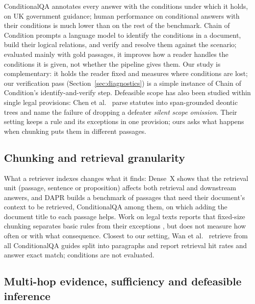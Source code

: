 ConditionalQA \cite{sun2022conditionalqa} annotates every answer with the conditions under which it holds, on UK government guidance; human performance on conditional answers with their conditions is much lower than on the rest of the benchmark. Chain of Condition \cite{lin2024chaincondition} prompts a language model to identify the conditions in a document, build their logical relations, and verify and resolve them against the scenario; evaluated mainly with gold passages, it improves how a reader handles the conditions it is given, not whether the pipeline gives them. Our study is complementary: it holds the reader fixed and measures where conditions are lost; our verification pass (Section~\ref{sec:diagnostics}) is a simple instance of Chain of Condition's identify-and-verify step. Defeasible scope has also been studied within single legal provisions: Chen et al.\ \cite{chen2026sgdt} parse statutes into span-grounded deontic trees and name the failure of dropping a defeater \emph{silent scope omission}. Their setting keeps a rule and its exceptions in one provision; ours asks what happens when chunking puts them in different passages.

\subsection{Chunking and retrieval granularity}

What a retriever indexes changes what it finds: Dense~X \cite{chen2024densex} shows that the retrieval unit (passage, sentence or proposition) affects both retrieval and downstream answers, and DAPR \cite{wang2024dapr} builds a benchmark of passages that need their document's context to be retrieved, ConditionalQA among them, on which adding the document title to each passage helps. Work on legal texts reports that fixed-size chunking separates basic rules from their exceptions \cite{prior2026chunking}, but does not measure how often or with what consequence. Closest to our setting, Wan et al.\ \cite{wan2026retrieverfree} retrieve from all ConditionalQA guides split into paragraphs and report retrieval hit rates and answer exact match; conditions are not evaluated.

\subsection{Multi-hop evidence, sufficiency and defeasible inference}

